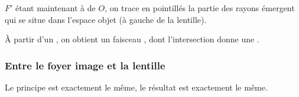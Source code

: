 \documentclass[10pt,a5paper,notitlepage]{book}
\begin{document}
$F'$ étant maintenant à  de $O$, on trace en pointillés la partie des
rayons émergent qui se situe dans l'espace objet (à gauche de la lentille).

À partir d'un , on obtient un faisceau , dont
l'intersection donne une .

\subsubsection{Entre le foyer image et la lentille}
Le principe est exactement le même, le résultat est exactement le même.

\begin{center}
\end{center}
\end{document}
